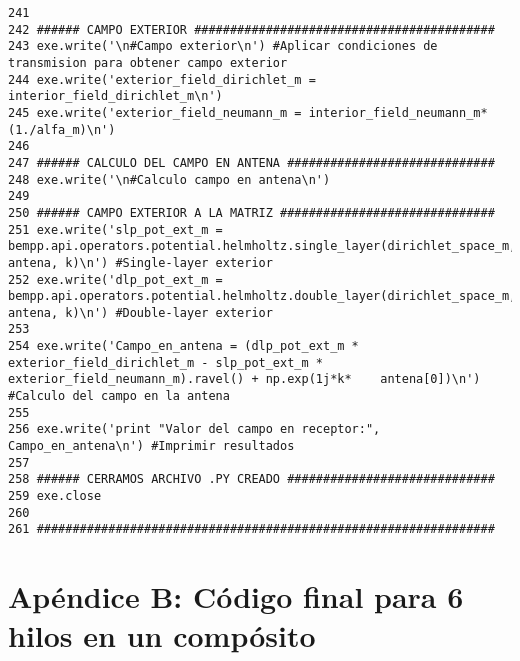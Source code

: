 \documentclass[12pt,letterpaper]{article}
\numberwithin{equation}{section}
\begin{document}
\begin{lstlisting}
241 
242 ###### CAMPO EXTERIOR ##########################################
243 exe.write('\n#Campo exterior\n') #Aplicar condiciones de transmision para obtener campo exterior 
244 exe.write('exterior_field_dirichlet_m = interior_field_dirichlet_m\n')
245 exe.write('exterior_field_neumann_m = interior_field_neumann_m*(1./alfa_m)\n')
246 
247 ###### CALCULO DEL CAMPO EN ANTENA #############################
248 exe.write('\n#Calculo campo en antena\n')
249 
250 ###### CAMPO EXTERIOR A LA MATRIZ ##############################
251 exe.write('slp_pot_ext_m = bempp.api.operators.potential.helmholtz.single_layer(dirichlet_space_m, antena, k)\n') #Single-layer exterior
252 exe.write('dlp_pot_ext_m = bempp.api.operators.potential.helmholtz.double_layer(dirichlet_space_m, antena, k)\n') #Double-layer exterior
253 
254 exe.write('Campo_en_antena = (dlp_pot_ext_m * exterior_field_dirichlet_m - slp_pot_ext_m * exterior_field_neumann_m).ravel() + np.exp(1j*k*    antena[0])\n') #Calculo del campo en la antena
255 
256 exe.write('print "Valor del campo en receptor:", Campo_en_antena\n') #Imprimir resultados
257 
258 ###### CERRAMOS ARCHIVO .PY CREADO #############################
259 exe.close
260 
261 ################################################################

\end{lstlisting}

\pagebreak

\part*{Apéndice B: Código final para 6 hilos en un compósito}
\end{document}
